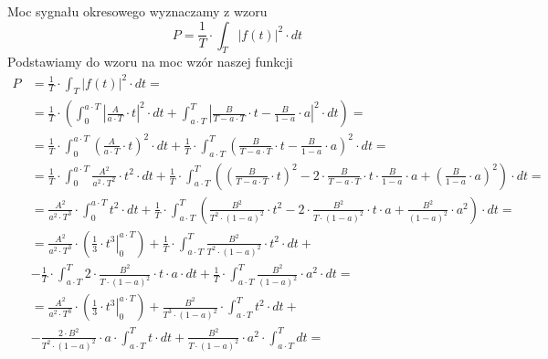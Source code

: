 \begin{task}
Moc sygnału okresowego wyznaczamy z wzoru
\begin{equation}
P=\frac{1}{T} \cdot \int_{T}^{}\left|f(t)\right|^2 \cdot dt
\end{equation}
Podstawiamy do wzoru na moc wzór naszej funkcji
\begin{align*}
P&=\frac{1}{T} \cdot \int_{T}^{}\left|f(t)\right|^2 \cdot dt=\\
 &=\frac{1}{T} \cdot \left( \int_{0}^{a \cdot T}\left|\frac{A}{a \cdot T}\cdot t \right|^2 \cdot dt
  +\int_{a \cdot T}^{T}\left|\frac{B}{T - a \cdot T}\cdot t - \frac{B}{1 - a} \cdot a\right|^2 \cdot dt \right)=\\ 
 &=\frac{1}{T} \cdot \int_{0}^{a \cdot T}\left(\frac{A}{a \cdot T}\cdot t \right)^2 \cdot dt
  +\frac{1}{T} \cdot \int_{a \cdot T}^{T}\left(\frac{B}{T - a \cdot T}\cdot t - \frac{B}{1 - a} \cdot a\right)^2 \cdot dt=\\ 
 &=\frac{1}{T} \cdot \int_{0}^{a \cdot T}\frac{A^2}{a^2 \cdot T^2}\cdot t^2 \cdot dt
 +\frac{1}{T} \cdot \int_{a \cdot T}^{T}\left(\left(\frac{B}{T - a \cdot T}\cdot t\right)^2 - 2\cdot \frac{B}{T - a \cdot T}\cdot t \cdot  \frac{B}{1 - a} \cdot a + \left( \frac{B}{1 - a} \cdot a\right)^2 \right) \cdot dt=\\
 &=\frac{A^2}{a^2 \cdot T^3}\cdot \int_{0}^{a \cdot T} t^2 \cdot dt
 +\frac{1}{T} \cdot \int_{a \cdot T}^{T}\left(\frac{B^2}{T^2 \cdot \left(1 - a \right)^2}\cdot t^2 - 2\cdot \frac{B^2}{T\cdot \left(1 - a\right)^2}\cdot t \cdot a + \frac{B^2}{\left(1 - a \right)^2} \cdot a^2 \right) \cdot dt=\\
 &=\frac{A^2}{a^2 \cdot T^3}\cdot \left(\left. \frac{1}{3}\cdot t^3 \right|_{0}^{a \cdot T} \right)
 +\frac{1}{T} \cdot \int_{a \cdot T}^{T} \frac{B^2}{T^2 \cdot \left(1 - a \right)^2}\cdot t^2 \cdot dt +\\
 &- \frac{1}{T} \cdot \int_{a \cdot T}^{T} 2\cdot \frac{B^2}{T\cdot \left(1 - a\right)^2}\cdot t \cdot a \cdot dt + \frac{1}{T} \cdot \int_{a \cdot T}^{T} \frac{B^2}{\left(1 - a \right)^2} \cdot a^2 \cdot dt=\\ 
 &=\frac{A^2}{a^2 \cdot T^3}\cdot \left(\left. \frac{1}{3}\cdot t^3 \right|_{0}^{a \cdot T} \right)
 +\frac{B^2}{T^3 \cdot \left(1 - a \right)^2}\cdot \int_{a \cdot T}^{T}  t^2 \cdot dt +\\
 &- \frac{2\cdot B^2}{T^2 \cdot \left(1 - a\right)^2}\cdot a \cdot \int_{a \cdot T}^{T} t \cdot dt 
 + \frac{B^2}{T \cdot \left(1 - a \right)^2} \cdot a^2 \cdot \int_{a \cdot T}^{T} dt=\\

\end{align*}
\end{task}
